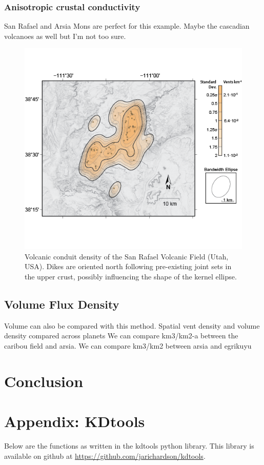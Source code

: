 \documentclass[12pt,letter]{article}
\begin{document}
\subsubsection{Anisotropic crustal conductivity}
San Rafael and Arsia Mons are perfect for this example. Maybe the cascadian volcanoes as well but I'm not too sure.


\begin{figure}
\centering
\includegraphics[width=0.6\linewidth]{figures/sanrafael_kde_72dpi}
\caption{Volcanic conduit density of the San Rafael Volcanic Field (Utah, USA). Dikes are oriented north following pre-existing joint sets in the upper crust, possibly influencing the shape of the kernel ellipse.}
\label{fig_sanrafaelkde}
\end{figure}


\subsection{Volume Flux Density}
Volume can also be compared with this method.
Spatial vent density and volume density compared across planets
We can compare km3/km2-a between the caribou field and arsia. We can compare km3/km2 between arsia and egrikuyu


\section{Conclusion}




\section{Appendix: KDtools}
\label{sec_kdtoolscode}
Below are the functions as written in the kdtools python library. This library is available on github at \url{https://github.com/jarichardson/kdtools}.
\end{document}
